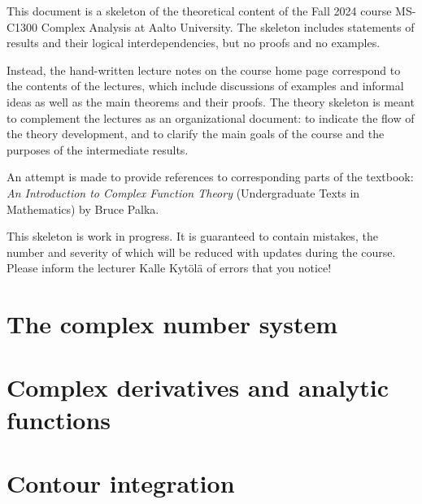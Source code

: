 %

This document is a skeleton of the theoretical content of
the Fall 2024 course MS-C1300 Complex Analysis at Aalto University.
The skeleton includes statements of results and their
logical interdependencies, but no proofs and no examples.

Instead, the hand-written lecture notes on the course home page correspond
to the contents of the lectures, which include discussions of examples and
informal ideas as well as the main theorems and their proofs.
The theory skeleton is meant to complement the lectures as
an organizational document: to indicate the flow of the theory
development, and to clarify the main goals of the course and the
purposes of the intermediate results.

An attempt is made to provide references to corresponding parts of
the textbook: \emph{An Introduction to Complex Function Theory}
(Undergraduate Texts in Mathematics) by Bruce Palka.

This skeleton is work in progress. It is guaranteed to contain mistakes,
the number and severity of which will be reduced with updates
during the course. Please inform the lecturer Kalle Kytölä of
errors that you notice!

\chapter{The complex number system}



\chapter{Complex derivatives and analytic functions}


\chapter{Contour integration}


